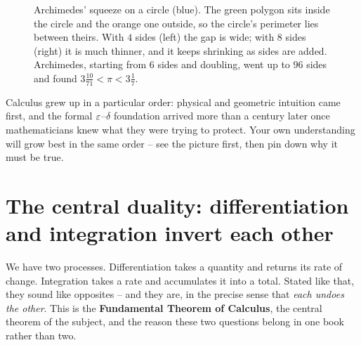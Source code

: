 \begin{figure}[htbp]
\centering
{}
\caption{Archimedes' squeeze on a circle (blue). The green polygon sits inside the circle and the orange one outside, so the circle's perimeter lies between theirs. With $4$ sides (left) the gap is wide; with $8$ sides (right) it is much thinner, and it keeps shrinking as sides are added. Archimedes, starting from $6$ sides and doubling, went up to $96$ sides and found $3\tfrac{10}{71} < \pi < 3\tfrac{1}{7}$.}
\label{ch01:fig-archimedes}
\end{figure}

\begin{aestheticbox}
Calculus grew up in a particular order: physical and geometric intuition came first, and the formal $\varepsilon$--$\delta$ foundation arrived more than a century later once mathematicians knew what they were trying to protect. Your own understanding will grow best in the same order -- see the picture first, then pin down why it must be true.
\end{aestheticbox}

\section{The central duality: differentiation and integration invert each other}

We have two processes. Differentiation takes a quantity and returns its rate of
change. Integration takes a rate and accumulates it into a total. Stated like
that, they sound like opposites -- and they are, in the precise sense that
\emph{each undoes the other}. This is the \textbf{Fundamental Theorem of
Calculus}, the central theorem of the subject, and the reason these two questions belong
in one book rather than two.

